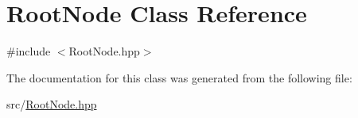 \hypertarget{classRootNode}{}\section{Root\+Node Class Reference}
\label{classRootNode}


{\ttfamily \#include $<$Root\+Node.\+hpp$>$}



The documentation for this class was generated from the following file\+:\begin{DoxyCompactItemize}
\item 
src/\hyperlink{RootNode_8hpp}{Root\+Node.\+hpp}\end{DoxyCompactItemize}
